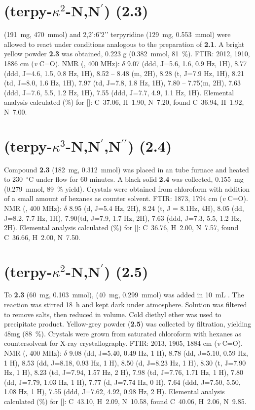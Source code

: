 \section{(terpy-$\kappa^2$-N,N$^\prime$) (\textbf{2.3})}\label{sec.c3}
 (191~mg, 470~mmol) and 2,2’:6’2’’ terpyridine (129~mg, 0.553~mmol) were allowed to react under conditions analogous to the preparation of \textbf{2.1}. A bright yellow powder \textbf{2.3} was obtained, 0.223 g (0.382~mmol, 81~\%). FTIR: 2012, 1910, 1886 cm (\textit{v} C=O).  NMR (, 400 MHz): $\delta$ 9.07 (ddd, J=5.6, 1.6, 0.9 Hz, 1H), 8.77 (ddd, J=4.6, 1.5, 0.8 Hz, 1H), 8.52 – 8.48 (m, 2H), 8.28 (t, J=7.9 Hz, 1H), 8.21 (td, J=8.0, 1.6 Hz, 1H), 7.97 (td, J=7.8, 1.8 Hz, 1H), 7.80 – 7.75(m, 2H), 7.63 (ddd, J=7.6, 5.5, 1.2 Hz, 1H), 7.55 (ddd, J=7.7, 4.9, 1.1 Hz, 1H). Elemental analysis calculated (\%) for []: C~37.06, H~1.90, N~7.20, found C~36.94, H~1.92, N~7.00.  

\section{(terpy-$\kappa^3$-N,N$^\prime$,N$^{\prime \prime}$) (\textbf{2.4})}\label{sec.c4}
Compound \textbf{2.3} (182~mg, 0.312~mmol) was placed in an tube furnace and heated to 230~$^\circ$C under  flow for 60 minutes. A black solid \textbf{2.4} was collected, 0.155~mg (0.279~mmol, 89~\% yield). Crystals were obtained from chloroform with addition of a small amount of hexanes as counter solvent. FTIR: 1873, 1794 cm (\textit{v} C=O).  NMR (, 400 MHz): $\delta$ 8.95 (d, J=5.4 Hz, 2H), 8.24 (t, J = 8.1Hz, 4H), 8.05 (dd, J=8.2, 7.7 Hz, 1H), 7.90(td, J=7.9, 1.7 Hz, 2H), 7.63 (ddd, J=7.3, 5.5, 1.2 Hz, 2H). Elemental analysis calculated (\%) for []: C~36.76, H~2.00, N~7.57, found C~36.66, H~2.00, N~7.50.

\section{(terpy-$\kappa^2$-N,N$^\prime$) (\textbf{2.5})} \label{sec.c5}
To \textbf{2.3} (60~mg, 0.103~mmol),  (40~mg, 0.299~mmol) was added in 10~mL . The reaction was stirred 18~h and kept dark under  atmosphere. Solution was filtered to remove salts, then reduced in volume. Cold diethyl ether was used to precipitate product. Yellow-grey powder (\textbf{2.5}) was collected by filtration, yielding 48mg (88~\%). Crystals were grown from saturated chloroform with hexanes as countersolvent for X-ray crystallography. FTIR: 2013, 1905, 1884 cm (\textit{v} C=O).  NMR (, 400 MHz): $\delta$ 9.08 (dd, J=5.40, 0.49 Hz, 1 H), 8.78 (dd, J=5.10, 0.59 Hz, 1 H), 8.53 (dd, J=8.18, 0.93 Hz, 1 H), 8.50 (d, J=8.23 Hz, 1 H), 8.30 (t, J=7.90 Hz, 1 H), 8.23 (td, J=7.94, 1.57 Hz, 2 H), 7.98 (td, J=7.76, 1.71 Hz, 1 H), 7.80 (dd, J=7.79, 1.03 Hz, 1 H), 7.77 (d, J=7.74 Hz, 0 H), 7.64 (ddd, J=7.50, 5.50, 1.08 Hz, 1 H), 7.55 (ddd, J=7.62, 4.92, 0.98 Hz, 2 H).  Elemental analysis calculated (\%) for []: C~43.10, H~2.09, N~10.58, found C~40.06, H~2.06, N~9.85.

